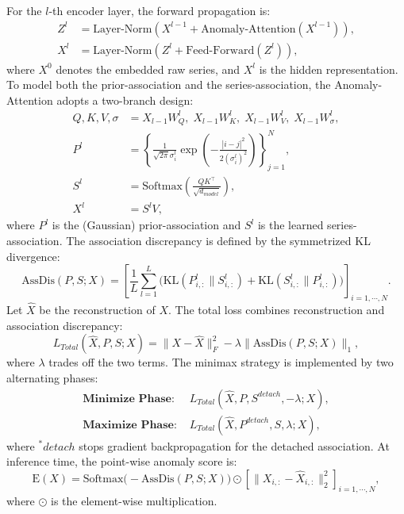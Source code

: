 \documentclass[pdflatex,sn-mathphys-num]{sn-jnl}
\theoremstyle{thmstyleone}
\theoremstyle{thmstyletwo}
\theoremstyle{thmstylethree}
\begin{document}
For the $l$-th encoder layer, the forward propagation is:
\begin{equation}
\begin{aligned}
Z^{l} &= \mathrm{Layer\text{-}Norm}\!\left(X^{l-1}+\mathrm{Anomaly\text{-}Attention}\!\left(X^{l-1}\right)\right),\\
X^{l} &= \mathrm{Layer\text{-}Norm}\!\left(Z^{l}+\mathrm{Feed\text{-}Forward}\!\left(Z^{l}\right)\right),
\end{aligned}
\end{equation}
where $X^{0}$ denotes the embedded raw series, and $X^{l}$ is the hidden representation.
To model both the prior-association and the series-association, the Anomaly-Attention adopts a two-branch design:
\begin{equation}
\begin{aligned}
Q,K,V,\sigma &= X_{l-1}W_{Q}^{l},\;X_{l-1}W_{K}^{l},\;X_{l-1}W_{V}^{l},\;X_{l-1}W_{\sigma}^{l},\\
P^{l} &= \left\{\frac{1}{\sqrt{2\pi}\sigma_{i}^{l}}
\exp\!\left(-\frac{|i-j|^{2}}{2(\sigma_{i}^{l})^{2}}\right)\right\}_{j=1}^{N},\\
S^{l} &= \mathrm{Softmax}\!\left(\frac{QK^{\top}}{\sqrt{d_{model}}}\right),\\
X^{l} &= S^{l}V,
\end{aligned}
\end{equation}
where $P^{l}$ is the (Gaussian) prior-association and $S^{l}$ is the learned series-association.
The association discrepancy is defined by the symmetrized KL divergence:
\begin{equation}
\mathrm{AssDis}(P,S;X)=
\left[
\frac{1}{L}\sum_{l=1}^{L}\Big(\mathrm{KL}(P^{l}_{i,:}\|S^{l}_{i,:})+\mathrm{KL}(S^{l}_{i,:}\|P^{l}_{i,:})\Big)
\right]_{i=1,\cdots,N}.
\end{equation}
Let $\hat{X}$ be the reconstruction of $X$. The total loss combines reconstruction and association discrepancy:
\begin{equation}
L_{Total}(\hat{X},P,S;X)=\|X-\hat{X}\|_{F}^{2}-\lambda\|\mathrm{AssDis}(P,S;X)\|_{1},
\end{equation}
where $\lambda$ trades off the two terms. The minimax strategy is implemented by two alternating phases:
\begin{equation}
\begin{aligned}
\textbf{Minimize Phase: } & L_{Total}(\hat{X},P,S^{detach},-\lambda;X),\\
\textbf{Maximize Phase: } & L_{Total}(\hat{X},P^{detach},S,\lambda;X),
\end{aligned}

\end{equation}
where $^\ast detach$ stops gradient backpropagation for the detached association. At inference time, the point-wise anomaly score is:
\begin{equation}
\mathrm{E}(X)=
\mathrm{Softmax}\!\big(-\mathrm{AssDis}(P,S;X)\big)
\odot
\left[\|X_{i,:}-\hat{X}_{i,:}\|_{2}^{2}\right]_{i=1,\cdots,N},
\end{equation}
where $\odot$ is the element-wise multiplication.
\end{document}
